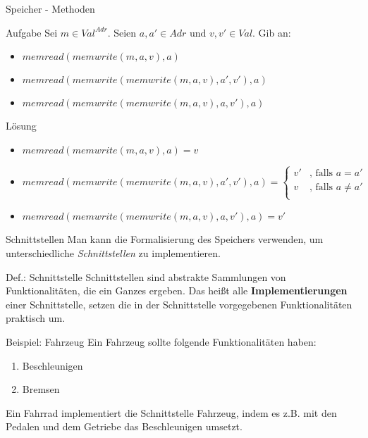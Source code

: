 
\begin{frame}{Speicher - Methoden}
	\begin{exampleblock}{Aufgabe}		
		Sei $m \in Val^{Adr}$. Seien $ a,a' \in Adr \text{ und } v,v' \in Val$. Gib an: \\
		\begin{itemize}
			\item $memread(memwrite(m,a,v),a)$
			\item $memread(memwrite(memwrite(m,a,v),a',v'),a)$
			\item $memread(memwrite(memwrite(m,a,v),a,v'),a)$
		\end{itemize}
	\end{exampleblock}
	\pause
	\begin{block}{Lösung}
	\small
		\begin{itemize}
			\item $memread(memwrite(m,a,v),a) = v$
			\item $memread(memwrite(memwrite(m,a,v),a',v'),a) = \begin{cases}
																	v' & \text{, falls } a = a' \\
																	v  & \text{, falls } a \neq a' \\
																\end{cases}$
			\item $memread(memwrite(memwrite(m,a,v),a,v'),a) = v' $
		\end{itemize}
	\end{block}
\end{frame}

\begin{frame}{Schnittstellen}
	Man kann die Formalisierung des Speichers verwenden, um unterschiedliche \emph{Schnittstellen} zu implementieren.\\[1em]

	\begin{block}{Def.: Schnittstelle}
		Schnittstellen sind abstrakte Sammlungen von Funktionalitäten, die ein Ganzes ergeben. Das heißt alle \textbf{Implementierungen} einer Schnittstelle, setzen die in der Schnittstelle vorgegebenen Funktionalitäten praktisch um. 
	\end{block}

	\begin{exampleblock}{Beispiel: Fahrzeug}
		Ein Fahrzeug sollte folgende Funktionalitäten haben:
		\begin{enumerate}
			\item Beschleunigen
			\item Bremsen
		\end{enumerate}

		Ein Fahrrad implementiert die Schnittstelle Fahrzeug, indem es z.B. mit den Pedalen und dem Getriebe das Beschleunigen umsetzt.
	\end{exampleblock}
\end{frame}

